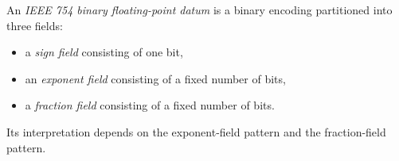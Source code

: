 \newcommand{\IEEEFloatLayout}[8]{%
\begin{center}
\begin{tikzpicture}[x=#1 cm,y=0.8cm]
    \pgfmathsetmacro{\SignEnd}{#2}
    \pgfmathsetmacro{\ExpEnd}{#2 + #3}
    \pgfmathsetmacro{\FracEnd}{#2 + #3 + #4}
    \pgfmathtruncatemacro{\SignBitLabel}{#5 - 1}

    \draw (0,0) rectangle (\SignEnd,1);
    \draw (\SignEnd,0) rectangle (\ExpEnd,1);
    \draw (\ExpEnd,0) rectangle (\FracEnd,1);

    \node at ({\SignEnd/2},0.5) {\small $s$};
    \node at ({(\SignEnd+\ExpEnd)/2},0.5) {\small exponent};
    \node at ({(\ExpEnd+\FracEnd)/2},0.5) {\small fraction};

    \node[above] at (0.5,1) {\scriptsize #5};
    \node[above] at ({\SignEnd+0.5},1) {\scriptsize \SignBitLabel};
    \node[above] at ({\ExpEnd-0.5},1) {\scriptsize #6};
    \node[above] at ({\ExpEnd+0.5},1) {\scriptsize #7};
    \node[above] at ({\FracEnd-0.5},1) {\scriptsize 0};
\end{tikzpicture}
\end{center}
}


\begin{tcolorbox}[title={Definition --- IEEE 754 Binary Floating-Point Datum}]
\begin{definition}
An \emph{IEEE 754 binary floating-point datum} is a binary encoding partitioned into
three fields:

\begin{itemize}
    \item a \emph{sign field} consisting of one bit,
    \item an \emph{exponent field} consisting of a fixed number of bits,
    \item a \emph{fraction field} consisting of a fixed number of bits.
\end{itemize}

Its interpretation depends on the exponent-field pattern and the fraction-field pattern.
\end{definition}
\end{tcolorbox}

